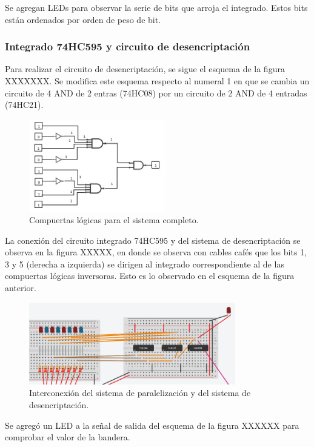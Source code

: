 \documentclass{article}
\begin{document}
Se agregan LEDs para observar la serie de bits que arroja el integrado. Estos bits están ordenados por orden de peso de bit.

\subsubsection{Integrado 74HC595 y circuito de desencriptación}

Para realizar el circuito de desencriptación, se sigue el esquema de la figura XXXXXXX. Se modifica este esquema respecto al numeral 1 en que se cambia un circuito de 4 AND de 2 entras (74HC08) por un circuito de 2 AND de 4 entradas (74HC21).


\begin{figure}[h]
\includegraphics[width=6cm]{compuertas_sistema_completo.PNG}
\centering
\caption{Compuertas lógicas para el sistema completo.}
\label{fig:compuertas_sistema_completo.PNG}
\end{figure}

La conexión del circuito integrado 74HC595 y del sistema de desencriptación se observa en la figura XXXXX, en donde se observa con cables cafés que los bits 1, 3 y 5 (derecha a izquierda) se dirigen al integrado correspondiente al de las compuertas lógicas inversoras. Esto es lo observado en el esquema de la figura anterior.


\begin{figure}[h]
\includegraphics[width=9cm]{74HC595 y sistema desencriptacion.PNG}
\centering
\caption{Interconexión del sistema de paralelización y del sistema de desencriptación.}
\label{fig:74HC595 y sistema desencriptacion.PNG}
\end{figure}

Se agregó un LED a la señal de salida del esquema de la figura XXXXXX para comprobar el valor de la bandera.
\newpage
\end{document}
